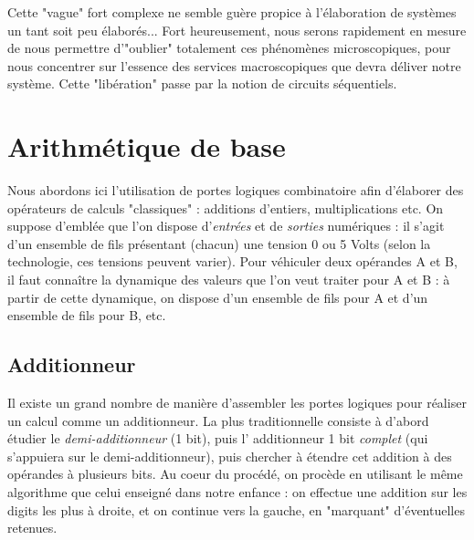 Cette "vague" fort complexe ne semble guère propice à l'élaboration de systèmes un tant soit peu élaborés...
Fort heureusement, nous serons rapidement en mesure de nous permettre d'"oublier" totalement ces phénomènes microscopiques, pour nous
concentrer sur l'essence des services macroscopiques que devra déliver notre système. Cette "libération" passe par la notion de circuits séquentiels.

\section{Arithmétique de base}
Nous abordons ici l'utilisation de portes logiques combinatoire afin d'élaborer des opérateurs de calculs "classiques" : additions d'entiers, multiplications etc.
On suppose d'emblée que l'on dispose d'{\it entrées} et de {\it sorties} numériques : il s'agit d'un ensemble de fils présentant (chacun) une tension 0 ou 5 Volts (selon la technologie, ces tensions peuvent varier).
Pour véhiculer deux opérandes A et B, il faut connaître la dynamique des valeurs que l'on veut traiter pour A et B : à partir de cette dynamique, on dispose d'un ensemble de fils
pour A et d'un ensemble de fils pour B, etc.

\subsection{Additionneur}
Il existe un grand nombre de manière d'assembler les portes logiques pour réaliser un calcul comme un additionneur.
La plus traditionnelle consiste à d'abord étudier le {\it demi-additionneur} (1 bit),
puis l' additionneur 1 bit {\it complet} (qui s'appuiera sur le demi-additionneur), puis chercher à étendre cet addition à des opérandes à plusieurs bits. Au coeur du procédé, on procède en utilisant le même algorithme
que celui enseigné dans notre enfance : on effectue une addition sur les digits les plus à droite, et on continue vers la gauche, en "marquant" d'éventuelles retenues.

